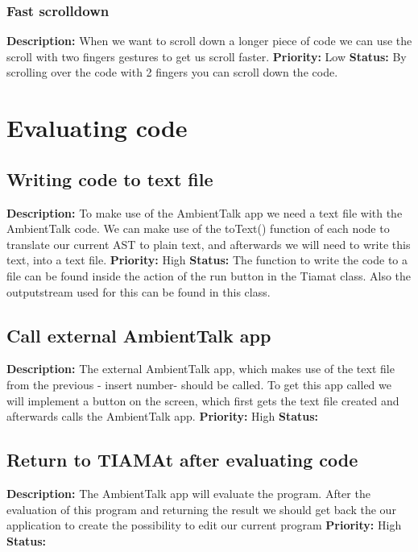 \documentclass[a4paper,12pt]{report}
\begin{document}
\subsubsection{Fast scrolldown}
\textbf{Description: }When we want to scroll down a longer piece of code we can use the scroll with two fingers gestures to get us scroll faster. \newline
\textbf{Priority:} Low \newline
\textbf{Status: } By scrolling over the code with 2 fingers you can scroll down the code.\newline
\section{Evaluating code}
\subsection{Writing code to text file}
\textbf{Description: }To make use of the AmbientTalk app we need a text file with the AmbientTalk code. We can make use of the toText() function of each node to translate our
current AST to plain text, and afterwards we will need to write this text, into a text file.  \newline
\textbf{Priority:} High \newline
\textbf{Status: } The function to write the code to a file can be found inside the action of the run button in the Tiamat class. Also the outputstream used for this can be found in this class.\newline
\subsection{Call external AmbientTalk app}
\textbf{Description: }The external AmbientTalk app, which makes use of the text file from the previous - insert number- should be called. To get this app called we will implement
a button on the screen, which first gets the text file created and afterwards calls the AmbientTalk app. \newline
\textbf{Priority:} High \newline
\textbf{Status: } \newline
\subsection{Return to TIAMAt after evaluating code}
\textbf{Description: } The AmbientTalk app will evaluate the program. After the evaluation of this program and returning the result we should get back the our application to
create the possibility to edit our current program\newline
\textbf{Priority:} High \newline
\textbf{Status: } \newline
\end{document}
